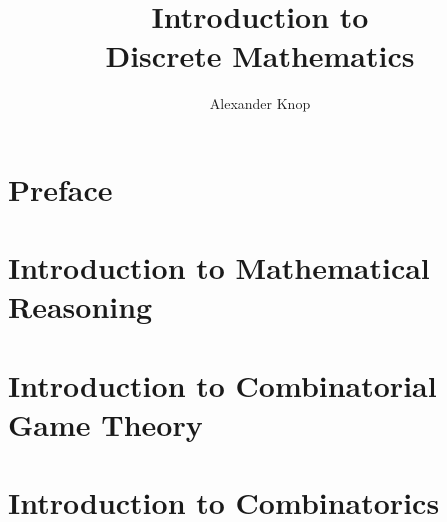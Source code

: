 

\title{ Introduction to \\Discrete Mathematics}
\author{Alexander Knop}


  \maketitle

  \frontmatter

  \tableofcontents

  \clearpage
  \markboth{\nomname}{\nomname}
  \printnomenclature

  \part*{Preface}
  

  \mainmatter

  \part{Introduction to Mathematical Reasoning}
  \label{part:mathematical-reasoning}
  
  
  
  
  
  
  
  

  \part{Introduction to Combinatorial Game Theory}
  \label{part:combinatorial-games}
  
  
  
  

  \part{Introduction to Combinatorics}
  \label{part:combinatorics}
  
  
  
  
  
  
  

